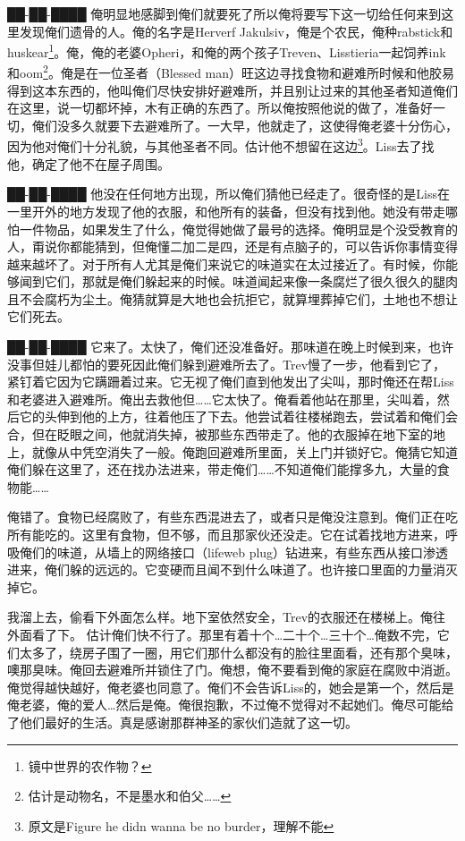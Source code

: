 \begin{scpbox}

██-██-████ 俺明显地感脚到俺们就要死了所以俺将要写下这一切给任何来到这里发现俺们遗骨的人。俺的名字是Herverf Jakulsiv，俺是个农民，俺种rabstick和huskear\footnote{镜中世界的农作物？}。俺，俺的老婆Opheri，和俺的两个孩子Treven、Lisstieria一起饲养ink和oom\footnote{估计是动物名，不是墨水和伯父……}。俺是在一位圣者（Blessed man）旺这边寻找食物和避难所时候和他胶易得到这本东西的，他叫俺们尽快安排好避难所，并且别让过来的其他圣者知道俺们在这里，说一切都坏掉，木有正确的东西了。所以俺按照他说的做了，准备好一切，俺们没多久就要下去避难所了。一大早，他就走了，这使得俺老婆十分伤心，因为他对俺们十分礼貌，与其他圣者不同。估计他不想留在这边\footnote{原文是Figure he didn wanna be no burder，理解不能}。Liss去了找他，确定了他不在屋子周围。

██-██-████ 他没在任何地方出现，所以俺们猜他已经走了。很奇怪的是Liss在一里开外的地方发现了他的衣服，和他所有的装备，但没有找到他。她没有带走哪怕一件物品，如果发生了什么，俺觉得她做了最号的选择。俺明显是个没受教育的人，甭说你都能猜到，但俺懂二加二是四，还是有点脑子的，可以告诉你事情变得越来越坏了。对于所有人尤其是俺们来说它的味道实在太过接近了。有时候，你能够闻到它们，那就是俺们躲起来的时候。味道闻起来像一条腐烂了很久很久的腿肉且不会腐朽为尘土。俺猜就算是大地也会抗拒它，就算埋葬掉它们，土地也不想让它们死去。

██-██-████ 它来了。太快了，俺们还没准备好。那味道在晚上时候到来，也许没事但娃儿都怕的要死因此俺们躲到避难所去了。Trev慢了一步，他看到它了，紧钉着它因为它蹒跚着过来。它无视了俺们直到他发出了尖叫，那时俺还在帮Liss和老婆进入避难所。俺出去救他但……它太快了。俺看着他站在那里，尖叫着，然后它的头伸到他的上方，往着他压了下去。他尝试着往楼梯跑去，尝试着和俺们会合，但在眨眼之间，他就消失掉，被那些东西带走了。他的衣服掉在地下室的地上，就像从中凭空消失了一般。俺跑回避难所里面，关上门并锁好它。俺猜它知道俺们躲在这里了，还在找办法进来，带走俺们……不知道俺们能撑多九，大量的食物能……

俺错了。食物已经腐败了，有些东西混进去了，或者只是俺没注意到。俺们正在吃所有能吃的。这里有食物，但不够，而且那家伙还没走。它在试着找地方进来，呼吸俺们的味道，从墙上的网络接口（lifeweb plug）钻进来，有些东西从接口渗透进来，俺们躲的远远的。它变硬而且闻不到什么味道了。也许接口里面的力量消灭掉它。

我溜上去，偷看下外面怎么样。地下室依然安全，Trev的衣服还在楼梯上。俺往外面看了下。 估计俺们快不行了。那里有着十个…二十个…三十个…俺数不完，它们太多了，绕房子围了一圈，用它们那什么都没有的脸往里面看，还有那个臭味，噢那臭味。俺回去避难所并锁住了门。俺想，俺不要看到俺的家庭在腐败中消逝。俺觉得越快越好，俺老婆也同意了。俺们不会告诉Liss的，她会是第一个，然后是俺老婆，俺的爱人…然后是俺。俺很抱歉，不过俺不觉得对不起她们。俺尽可能给了他们最好的生活。真是感谢那群神圣的家伙们造就了这一切。


\end{scpbox}
